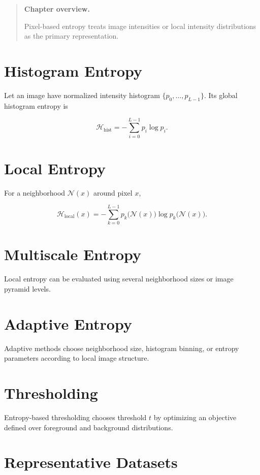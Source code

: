 \documentclass[11pt,oneside]{book}
\theoremstyle{remark}
\newcommand{\Entropy}{\mathcal{H}}
\newenvironment{chapteroverview}
{
	\begin{quote}
		\small
		\textbf{Chapter overview.}
	}
	{
	\end{quote}
}
\begin{document}
	\begin{chapteroverview}
		Pixel-based entropy treats image intensities or local intensity distributions
		as the primary representation.
	\end{chapteroverview}
	
	\section{Histogram Entropy}
	
	Let an image have normalized intensity histogram
	\(\{p_0,\ldots,p_{L-1}\}\). Its global histogram entropy is
	
	\[
	\Entropy_{\mathrm{hist}}
	=
	-\sum_{i=0}^{L-1} p_i\log p_i.
	\]
	
	\section{Local Entropy}
	
	For a neighborhood \(\mathcal{N}(x)\) around pixel \(x\),
	
	\[
	\Entropy_{\mathrm{local}}(x)
	=
	-\sum_{k=0}^{L-1}
	p_k\bigl(\mathcal{N}(x)\bigr)
	\log
	p_k\bigl(\mathcal{N}(x)\bigr).
	\]
	
	\section{Multiscale Entropy}
	
	Local entropy can be evaluated using several neighborhood sizes or image
	pyramid levels.
	
	\section{Adaptive Entropy}
	
	Adaptive methods choose neighborhood size, histogram binning, or entropy
	parameters according to local image structure.
	
	\section{Thresholding}
	
	Entropy-based thresholding chooses threshold \(t\) by optimizing an objective
	defined over foreground and background distributions.
	
	\section*{Representative Datasets}
	
\end{document}

